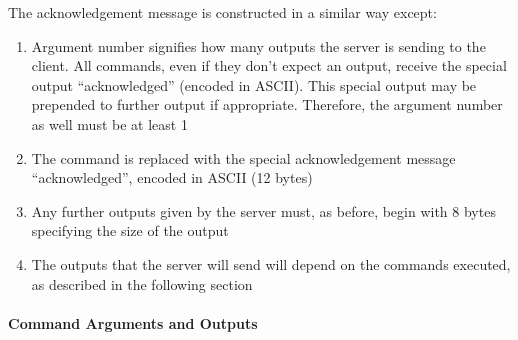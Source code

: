 \documentclass[12pt]{article}
\begin{document}
The acknowledgement message is constructed in a similar way except:

\begin{enumerate}
    \item Argument number signifies how many outputs the server is sending to the client. All commands, even if they don’t expect an output, receive the special output “acknowledged” (encoded in ASCII). This special output may be prepended to further output if appropriate. Therefore, the argument number as well must be at least 1
    \item The command is replaced with the special acknowledgement message “acknowledged”, encoded in ASCII (12 bytes)
    \item Any further outputs given by the server must, as before, begin with 8 bytes specifying the size of the output
    \item The outputs that the server will send will depend on the commands executed, as described in the following section

\end{enumerate}

\paragraph{Command Arguments and Outputs}
\end{document}
